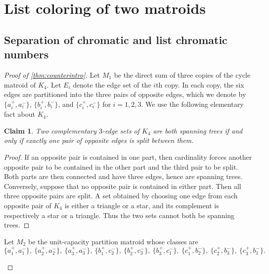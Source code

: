 \documentclass[10pt,a4paper]{article}
\theoremstyle{plain}
\newtheorem{cla}[thm]{Claim}
\theoremstyle{definition}
\begin{document}
\section{List coloring of two matroids}
\label{sec:intersection}

\subsection{Separation of chromatic and list chromatic numbers}
\label{sec:counterexample}


\begin{proof}[Proof of \cref{thm:counterintro}]
Let $M_1$ be the direct sum of three copies of the cycle matroid of $K_4$. Let $E_i$ denote the edge set of the $i$th copy. In each copy, the six edges are partitioned into the three pairs of opposite edges, which we denote by $\{a_i^+,a_i^-\}$, $\{b_i^+,b_i^-\}$, and $\{c_i^+,c_i^-\}$ for $i=1,2,3$. We use the following elementary fact about $K_4$.

\begin{cla}\label{cla:k4}
Two complementary $3$-edge sets of $K_4$ are both spanning trees if and only if exactly one pair of opposite edges is split between them.
\end{cla}

\begin{proof}
If an opposite pair is contained in one part, then cardinality forces another opposite pair to be contained in the other part and the third pair to be split. Both parts are then connected and have three edges, hence are spanning trees. Conversely, suppose that no opposite pair is contained in either part. Then all three opposite pairs are split. A set obtained by choosing one edge from each opposite pair of $K_4$ is either a triangle or a star, and its complement is respectively a star or a triangle. Thus the two sets cannot both be spanning trees.
\end{proof}

Let $M_2$ be the unit-capacity partition matroid whose classes are
\[
\{a_1^+,a_1^-\},\ \{a_2^+,a_2^-\},\ \{a_3^+,a_3^-\},\ 
\{b_1^+,c_2^-\},\ \{b_2^+,c_3^-\},\ \{b_3^+,c_1^-\},\ 
\{c_1^+,b_2^-\},\ \{c_2^+,b_3^-\},\ \{c_3^+,b_1^-\}.
\]

\begin{figure}[t]
\centering
{}
\end{figure}
\end{proof}
\end{document}
